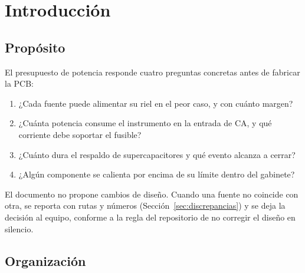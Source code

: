 \documentclass[11pt,a4paper]{article}
\begin{document}
\newpage
\tableofcontents
\newpage
\listoffigures
\vspace{0.5em}
\listoftables

\newpage
{}
\setcounter{page}{1}

\section{Introducción}

\subsection{Propósito}

El presupuesto de potencia responde cuatro preguntas concretas antes de
fabricar la PCB:

\begin{enumerate}
  \item ¿Cada fuente puede alimentar su riel en el peor caso, y con cuánto margen?
  \item ¿Cuánta potencia consume el instrumento en la entrada de CA, y qué
        corriente debe soportar el fusible?
  \item ¿Cuánto dura el respaldo de supercapacitores y qué evento alcanza a
        cerrar?
  \item ¿Algún componente se calienta por encima de su límite dentro del
        gabinete?
\end{enumerate}

El documento no propone cambios de diseño. Cuando una fuente no coincide con
otra, se reporta con rutas y números (Sección~\ref{sec:discrepancias}) y se deja
la decisión al equipo, conforme a la regla del repositorio de no corregir el
diseño en silencio.

\subsection{Organización}
\end{document}
